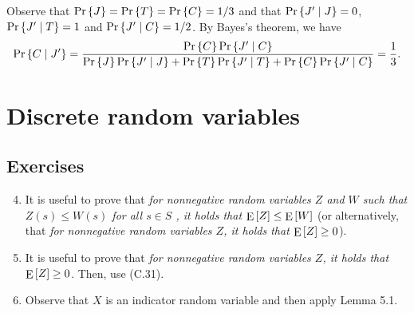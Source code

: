 \begin{enumerate}[\thesection-1]
Observe that $\Pr\left\{J\right\} = \Pr\left\{T\right\} = \Pr\left\{C\right\} = 1/3$ and that $\Pr\left\{J' \mid J\right\} = 0$, $\Pr\left\{J' \mid T\right\} = 1$ and $\Pr\left\{J' \mid C\right\} = 1/2$. By Bayes's theorem, we have
\[
\Pr\left\{C \mid J'\right\} = \frac{\Pr\left\{C\right\} \Pr\left\{J' \mid C\right\}}{\Pr\left\{J\right\} \Pr\left\{J' \mid J\right\} + \Pr\left\{T\right\} \Pr\left\{J' \mid T\right\} + \Pr\left\{C\right\} \Pr\left\{J' \mid C\right\}} = \frac{1}{3}.
\]
%
\end{enumerate}

\section{Discrete random variables}
\subsection*{Exercises}
\begin{enumerate}[\thesection-1]
%
\setcounter{enumi}{3}
%
\item It is useful to prove that \emph{for nonnegative random variables $Z$ and $W$ such that $Z(s) \leq W(s)$ for all $s \in S$ , it holds that $\mathop{\mathrm{E}}\left[Z\right] \leq \mathop{\mathrm{E}}\left[W\right]$} (or alternatively, that \emph{for nonnegative random variables $Z$, it holds that $\mathop{\mathrm{E}}\left[Z\right] \geq 0$}).
%
\setcounter{enumi}{7}
%
\item It is useful to prove that \emph{for nonnegative random variables $Z$, it holds that $\mathop{\mathrm{E}}\left[Z\right] \geq 0$}. Then, use (C.31).
%
\item Observe that $X$ is an indicator random variable and then apply Lemma 5.1.
%
\end{enumerate}
